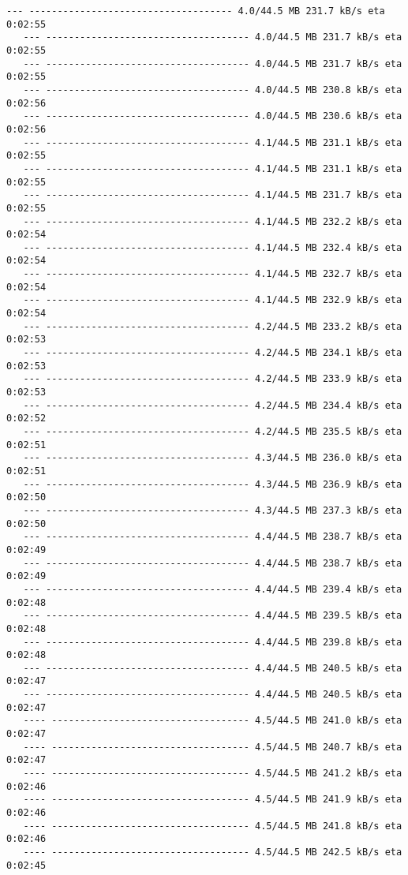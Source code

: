 \documentclass[11pt]{article}
\begin{document}
\begin{Verbatim}[commandchars=\\\{\}]
   --- ------------------------------------ 4.0/44.5 MB 231.7 kB/s eta 0:02:55
   --- ------------------------------------ 4.0/44.5 MB 231.7 kB/s eta 0:02:55
   --- ------------------------------------ 4.0/44.5 MB 231.7 kB/s eta 0:02:55
   --- ------------------------------------ 4.0/44.5 MB 230.8 kB/s eta 0:02:56
   --- ------------------------------------ 4.0/44.5 MB 230.6 kB/s eta 0:02:56
   --- ------------------------------------ 4.1/44.5 MB 231.1 kB/s eta 0:02:55
   --- ------------------------------------ 4.1/44.5 MB 231.1 kB/s eta 0:02:55
   --- ------------------------------------ 4.1/44.5 MB 231.7 kB/s eta 0:02:55
   --- ------------------------------------ 4.1/44.5 MB 232.2 kB/s eta 0:02:54
   --- ------------------------------------ 4.1/44.5 MB 232.4 kB/s eta 0:02:54
   --- ------------------------------------ 4.1/44.5 MB 232.7 kB/s eta 0:02:54
   --- ------------------------------------ 4.1/44.5 MB 232.9 kB/s eta 0:02:54
   --- ------------------------------------ 4.2/44.5 MB 233.2 kB/s eta 0:02:53
   --- ------------------------------------ 4.2/44.5 MB 234.1 kB/s eta 0:02:53
   --- ------------------------------------ 4.2/44.5 MB 233.9 kB/s eta 0:02:53
   --- ------------------------------------ 4.2/44.5 MB 234.4 kB/s eta 0:02:52
   --- ------------------------------------ 4.2/44.5 MB 235.5 kB/s eta 0:02:51
   --- ------------------------------------ 4.3/44.5 MB 236.0 kB/s eta 0:02:51
   --- ------------------------------------ 4.3/44.5 MB 236.9 kB/s eta 0:02:50
   --- ------------------------------------ 4.3/44.5 MB 237.3 kB/s eta 0:02:50
   --- ------------------------------------ 4.4/44.5 MB 238.7 kB/s eta 0:02:49
   --- ------------------------------------ 4.4/44.5 MB 238.7 kB/s eta 0:02:49
   --- ------------------------------------ 4.4/44.5 MB 239.4 kB/s eta 0:02:48
   --- ------------------------------------ 4.4/44.5 MB 239.5 kB/s eta 0:02:48
   --- ------------------------------------ 4.4/44.5 MB 239.8 kB/s eta 0:02:48
   --- ------------------------------------ 4.4/44.5 MB 240.5 kB/s eta 0:02:47
   --- ------------------------------------ 4.4/44.5 MB 240.5 kB/s eta 0:02:47
   ---- ----------------------------------- 4.5/44.5 MB 241.0 kB/s eta 0:02:47
   ---- ----------------------------------- 4.5/44.5 MB 240.7 kB/s eta 0:02:47
   ---- ----------------------------------- 4.5/44.5 MB 241.2 kB/s eta 0:02:46
   ---- ----------------------------------- 4.5/44.5 MB 241.9 kB/s eta 0:02:46
   ---- ----------------------------------- 4.5/44.5 MB 241.8 kB/s eta 0:02:46
   ---- ----------------------------------- 4.5/44.5 MB 242.5 kB/s eta 0:02:45

\end{Verbatim}
\end{document}
